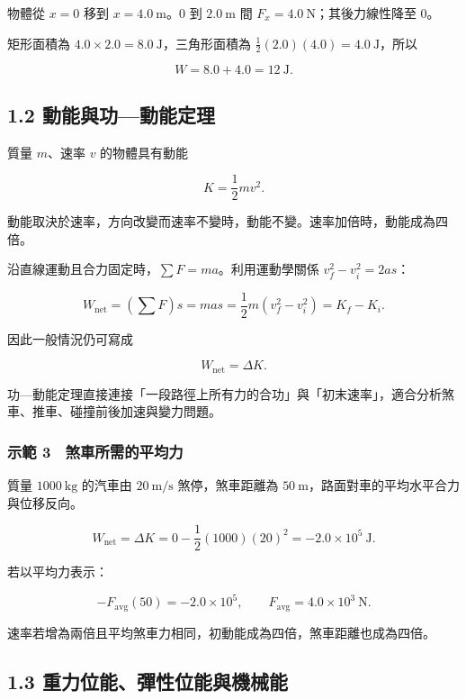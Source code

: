 \documentclass[11pt,a4paper]{article}
\begin{document}
物體從 \(x=0\) 移到 \(x=4.0\ \mathrm m\)。\(0\) 到 \(2.0\ \mathrm m\) 間 \(F_x=4.0\ \mathrm N\)；其後力線性降至 \(0\)。

矩形面積為 \(4.0\times2.0=8.0\ \mathrm J\)，三角形面積為 \(\frac12(2.0)(4.0)=4.0\ \mathrm J\)，所以

\[
W=8.0+4.0=12\ \mathrm J.
\]

\subsection{1.2 動能與功---動能定理}\label{ux52d5ux80fdux8207ux529fux52d5ux80fdux5b9aux7406}

質量 \(m\)、速率 \(v\) 的物體具有動能

\[
K=\frac12mv^2.
\]

動能取決於速率，方向改變而速率不變時，動能不變。速率加倍時，動能成為四倍。

沿直線運動且合力固定時，\(\sum F=ma\)。利用運動學關係 \(v_f^2-v_i^2=2as\)：

\[
W_{\mathrm{net}}=(\sum F)s=mas
=\frac12m(v_f^2-v_i^2)
=K_f-K_i.
\]

因此一般情況仍可寫成

\[
\boxed{W_{\mathrm{net}}=\Delta K}.
\]

功---動能定理直接連接「一段路徑上所有力的合功」與「初末速率」，適合分析煞車、推車、碰撞前後加速與變力問題。

\subsubsection{示範 3　煞車所需的平均力}\label{ux793aux7bc4-3-ux715eux8ecaux6240ux9700ux7684ux5e73ux5747ux529b}

質量 \(1000\ \mathrm{kg}\) 的汽車由 \(20\ \mathrm{m/s}\) 煞停，煞車距離為 \(50\ \mathrm m\)，路面對車的平均水平合力與位移反向。

\[
W_{\mathrm{net}}=\Delta K=0-\frac12(1000)(20)^2=-2.0\times10^5\ \mathrm J.
\]

若以平均力表示：

\[
-F_{\mathrm{avg}}(50)=-2.0\times10^5,
\qquad
F_{\mathrm{avg}}=4.0\times10^3\ \mathrm N.
\]

速率若增為兩倍且平均煞車力相同，初動能成為四倍，煞車距離也成為四倍。

\subsection{1.3 重力位能、彈性位能與機械能}\label{ux91cdux529bux4f4dux80fdux5f48ux6027ux4f4dux80fdux8207ux6a5fux68b0ux80fd}
\end{document}
